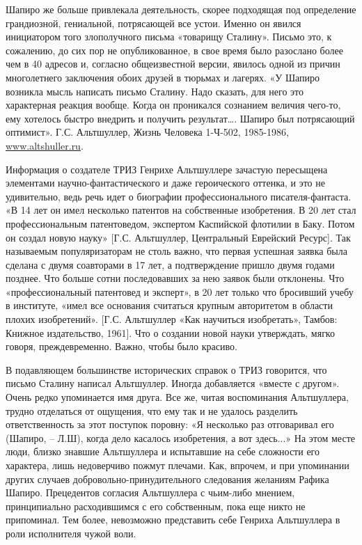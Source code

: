 \documentclass[11pt,a4paper]{article}
\begin{document}
Шапиро же больше привлекала деятельность, скорее подходящая под определение
грандиозной, гениальной, потрясающей все устои. Именно он явился инициатором
того злополучного письма «товарищу Сталину». Письмо это, к сожалению, до сих
пор не опубликованное, в свое время было разослано более чем в 40 адресов и,
согласно общеизвестной версии, явилось одной из причин многолетнего заключения
обоих друзей в тюрьмах и лагерях. «У Шапиро возникла мысль написать письмо
Сталину. Надо сказать, для него это характерная реакция вообще. Когда он
проникался сознанием величия чего-то, ему хотелось быстро внедрить и получить
результат…. Шапиро был потрясающий оптимист». Г.С. Альтшуллер, Жизнь Человека
1-Ч-502, 1985-1986, \url{www.altshuller.ru}.

Информация о создателе ТРИЗ Генрихе Альтшуллере зачастую пересыщена элементами
научно-фантастического и даже героического оттенка, и это не удивительно, ведь
речь идет о биографии профессионального писателя-фантаста. «В 14 лет он имел
несколько патентов на собственные изобретения. В 20 лет стал профессиональным
патентоведом, экспертом Каспийской флотилии в Баку. Потом он создал новую
науку» [Г.С. Альтшуллер, Центральный Еврейский Ресурс]. Так называемым
популяризаторам не столь важно, что первая успешная заявка была сделана с
двумя соавторами в 17 лет, а подтверждение пришло двумя годами позднее. Что
больше сотни последовавших за нею заявок были отклонены. Что «профессиональный
патентовед и эксперт», в 20 лет только что бросивший учебу в институте, «имел
все основания считаться крупным авторитетом в области плохих изобретений».
[Г.С. Альтшуллер «Как научиться изобретать», Тамбов: Книжное издательство,
  1961].  Что о создании новой науки утверждать, мягко говоря,
преждевременно. Важно, чтобы было красиво.

В подавляющем большинстве исторических справок о ТРИЗ говорится, что письмо
Сталину написал Альтшуллер. Иногда добавляется «вместе с другом». Очень редко
упоминается имя друга. Все же, читая воспоминания Альтшуллера, трудно
отделаться от ощущения, что ему так и не удалось разделить ответственность за
этот поступок поровну: «Я несколько раз отговаривал его (Шапиро, -- Л.Ш),
когда дело касалось изобретения, а вот здесь...» На этом месте люди, близко
знавшие Альтшуллера и испытавшие на себе сложности его характера, лишь
недоверчиво пожмут плечами. Как, впрочем, и при упоминании других случаев
добровольно-принудительного следования желаниям Рафика Шапиро. Прецедентов
согласия Альтшуллера с чьим-либо мнением, принципиально расходившимся с его
собственным, пока еще никто не припоминал. Тем более, невозможно представить
себе Генриха Альтшуллера в роли исполнителя чужой воли.
\end{document}
